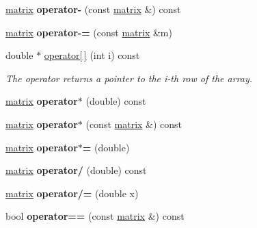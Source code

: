\begin{DoxyCompactItemize}
\item 
\mbox{\label{classmatrix_aefe9d9fce389bbbdf81a804a416dbe83}} 
\mbox{\hyperlink{classmatrix}{matrix}} {\bfseries operator-\/} (const \mbox{\hyperlink{classmatrix}{matrix}} \&) const
\item 
\mbox{\label{classmatrix_a445583c6509980c6aceeeebfb2fcd8e0}} 
\mbox{\hyperlink{classmatrix}{matrix}} {\bfseries operator-\/=} (const \mbox{\hyperlink{classmatrix}{matrix}} \&m)
\item 
\mbox{\label{classmatrix_a1ee2533474ec9e3b7db4203b8fb9b6e0}} 
double $\ast$ \mbox{\hyperlink{classmatrix_a1ee2533474ec9e3b7db4203b8fb9b6e0}{operator\mbox{[}$\,$\mbox{]}}} (int i) const
\begin{DoxyCompactList}\small\item\em The operator returns a pointer to the i-\/th row of the array. \end{DoxyCompactList}\item 
\mbox{\label{classmatrix_a59139bc18f039339e9a581c96fddb674}} 
\mbox{\hyperlink{classmatrix}{matrix}} {\bfseries operator$\ast$} (double) const
\item 
\mbox{\label{classmatrix_a1b07b334ce71db5a644affa22bbb2ac2}} 
\mbox{\hyperlink{classmatrix}{matrix}} {\bfseries operator$\ast$} (const \mbox{\hyperlink{classmatrix}{matrix}} \&) const
\item 
\mbox{\label{classmatrix_aa29824e63e29bb6249db2076fcb20b9c}} 
\mbox{\hyperlink{classmatrix}{matrix}} {\bfseries operator$\ast$=} (double)
\item 
\mbox{\label{classmatrix_a0a6164b6e48bae9ada50c8f4a5a68a22}} 
\mbox{\hyperlink{classmatrix}{matrix}} {\bfseries operator/} (double) const
\item 
\mbox{\label{classmatrix_ac3e138b950721c43de696919f7837978}} 
\mbox{\hyperlink{classmatrix}{matrix}} {\bfseries operator/=} (double x)
\item 
\mbox{\label{classmatrix_a6a864a6d8d0ff7f66c9bfd60a5fab5a4}} 
bool {\bfseries operator==} (const \mbox{\hyperlink{classmatrix}{matrix}} \&) const

\end{DoxyCompactItemize}
